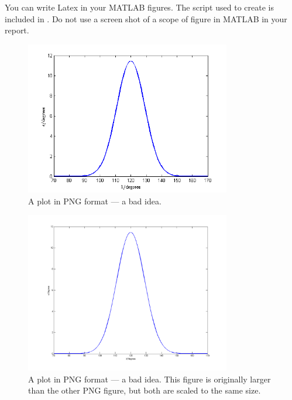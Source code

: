 You can write Latex in your MATLAB figures. The script used to create  is included in . Do not use a screen shot of a scope of figure in MATLAB in your report.


\begin{figure}[htb]
	\centering
		\includegraphics[width=0.8\textwidth]{figures/constraint_png.png}
	\caption{A plot in PNG format --- a bad idea.}
\label{fig:constraint_png}
\end{figure}

\begin{figure}[htb]
	\centering
		\includegraphics[width=0.8\textwidth]{figures/constraint_png_large.png}
	\caption{A plot in PNG format --- a bad idea. This figure is originally larger than the other PNG figure, but both are scaled to the same size.}
\label{fig:constraint_png_large}
\end{figure}

